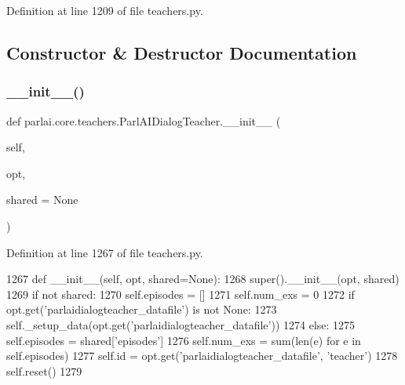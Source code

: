 Definition at line 1209 of file teachers.\+py.



\subsection{Constructor \& Destructor Documentation}
\mbox{\label{classparlai_1_1core_1_1teachers_1_1ParlAIDialogTeacher_ad79a47d28e60c24df72b8523aff6b247}} 
\subsubsection{\texorpdfstring{\+\_\+\+\_\+init\+\_\+\+\_\+()}{\_\_init\_\_()}}
{\footnotesize\ttfamily def parlai.\+core.\+teachers.\+Parl\+A\+I\+Dialog\+Teacher.\+\_\+\+\_\+init\+\_\+\+\_\+ (\begin{DoxyParamCaption}\item[{}]{self,  }\item[{}]{opt,  }\item[{}]{shared = {\ttfamily None} }\end{DoxyParamCaption})}



Definition at line 1267 of file teachers.\+py.


\begin{DoxyCode}
1267     \textcolor{keyword}{def }\_\_init\_\_(self, opt, shared=None):
1268         super().\_\_init\_\_(opt, shared)
1269         \textcolor{keywordflow}{if} \textcolor{keywordflow}{not} shared:
1270             self.episodes = []
1271             self.num\_exs = 0
1272             \textcolor{keywordflow}{if} opt.get(\textcolor{stringliteral}{'parlaidialogteacher\_datafile'}) \textcolor{keywordflow}{is} \textcolor{keywordflow}{not} \textcolor{keywordtype}{None}:
1273                 self.\_setup\_data(opt.get(\textcolor{stringliteral}{'parlaidialogteacher\_datafile'}))
1274         \textcolor{keywordflow}{else}:
1275             self.episodes = shared[\textcolor{stringliteral}{'episodes'}]
1276             self.num\_exs = sum(len(e) \textcolor{keywordflow}{for} e \textcolor{keywordflow}{in} self.episodes)
1277         self.id = opt.get(\textcolor{stringliteral}{'parlaidialogteacher\_datafile'}, \textcolor{stringliteral}{'teacher'})
1278         self.reset()
1279 
\end{DoxyCode}


